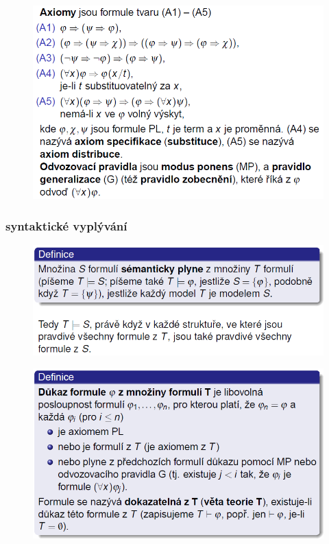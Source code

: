 \documentclass[10pt,a4paper]{article}
\theoremstyle{note}
\begin{document}
			\begin{figure}[H]
			\centering
			\includegraphics[width=13cm]{img/axiomyPL.png}
			\end{figure}

		\subsubsection{syntaktické vyplývání}

			\begin{figure}[H]
			\centering
			\includegraphics[width=13cm]{img/semantickeVyplyvaniPL.png}
			\end{figure}

			\begin{figure}[H]
			\centering
			\includegraphics[width=13cm]{img/syntaktickeVyplyvaniPL.png}
			\end{figure}
\end{document}
